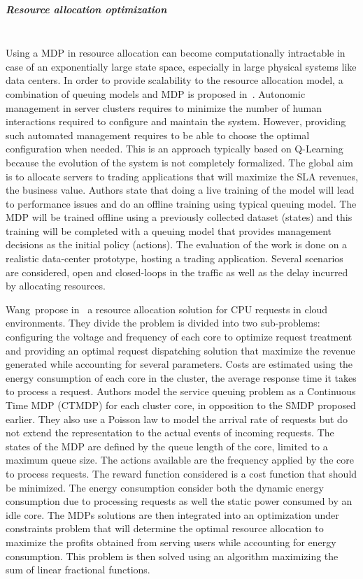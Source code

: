 \subparagraph{Resource allocation optimization}
\textbf{\\}
Using a MDP in resource allocation can become computationally intractable in case of an exponentially large state space, especially in large physical systems like data centers. In order to provide scalability to the resource allocation model, a combination of queuing models and MDP is proposed in~\cite{Tesauro2006}.
Autonomic management in server clusters requires to minimize the number of human interactions required to configure and maintain the system.
However, providing such automated management requires to be able to choose the optimal configuration when needed.
This is an approach typically based on Q-Learning because the evolution of the system is not completely formalized.
The global aim is to allocate servers to trading applications that will maximize the SLA revenues, \ie the business value.
Authors state that doing a live training of the model will lead to performance issues and do an offline training using typical queuing model. The MDP will be trained offline using a previously collected dataset (states) and this training will be completed with a queuing model that provides management decisions as the initial policy (actions).
The evaluation of the work is done on a realistic data-center prototype, hosting a trading application. 
Several scenarios are considered, open and closed-loops in the traffic as well as the delay incurred by allocating resources.

Wang~\etal propose in~\cite{Wang2013} a resource allocation solution for CPU requests in cloud environments.
They divide the problem is divided into two sub-problems: configuring the voltage and frequency of each core to optimize request treatment and providing an optimal request dispatching solution that maximize the revenue generated while accounting for several parameters.
Costs are estimated using the energy consumption of each core in the cluster, the average response time it takes to process a request.
Authors model the service queuing problem as a Continuous Time MDP (CTMDP) for each cluster core, in opposition to the SMDP proposed earlier.
They also use a Poisson law to model the arrival rate of requests but do not extend the representation to the actual events of incoming requests.
The states of the MDP are defined by the queue length of the core, limited to a maximum queue size. The actions available are the frequency applied by the core to process requests.
The reward function considered is a cost function that should be minimized.
The energy consumption consider both the dynamic energy consumption due to processing requests as well the static power consumed by an idle core.
The MDPs solutions are then integrated into an optimization under constraints problem that will determine the optimal resource allocation to maximize the profits obtained from serving users while accounting for energy consumption.
This problem is then solved using an algorithm maximizing the sum of linear fractional functions.


